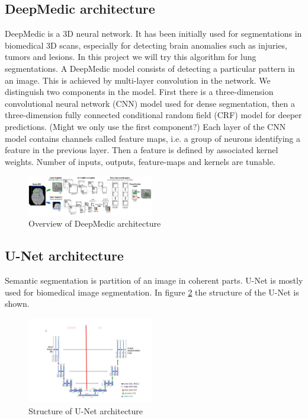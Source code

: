 \subsection{DeepMedic architecture}
DeepMedic is a 3D neural network. It has been initially used for segmentations in biomedical 3D scans, especially for detecting brain anomalies such as injuries, tumors and lesions. In this project we will try this algorithm for lung segmentations. \newline 
A DeepMedic model consists of detecting a particular pattern in an image. This is achieved by multi-layer convolution in the network. We distinguish two components in the model. First there is a three-dimension convolutional neural network (CNN) model used for dense segmentation, then  a three-dimension fully connected conditional random field (CRF) model for deeper predictions. (Might we only use the first component?) \newline
Each layer of the CNN model contains channels called feature maps, i.e. a group of neurons identifying a feature in the previous layer. Then a feature is defined by associated kernel weights. Number of inputs, outputs, feature-maps and kernels are tunable.

\begin{figure}[h!]
	\includegraphics[width=0.49\textwidth, angle=0]{files/deepmedic.png}
	\caption{ Overview of DeepMedic architecture}
	\label{deepmedic}
\end{figure}

\subsection{U-Net architecture}
Semantic segmentation is partition of an image in coherent parts. U-Net is mostly used for biomedical image segmentation. In figure \ref{unetstructure} the structure of the U-Net is shown.\newline

\begin{figure}[h!]
	\includegraphics[width=0.49\textwidth, angle=0]{files/unetstructure.jpg}
	\caption{Structure of U-Net architecture}
	\label{unetstructure}
\end{figure}

